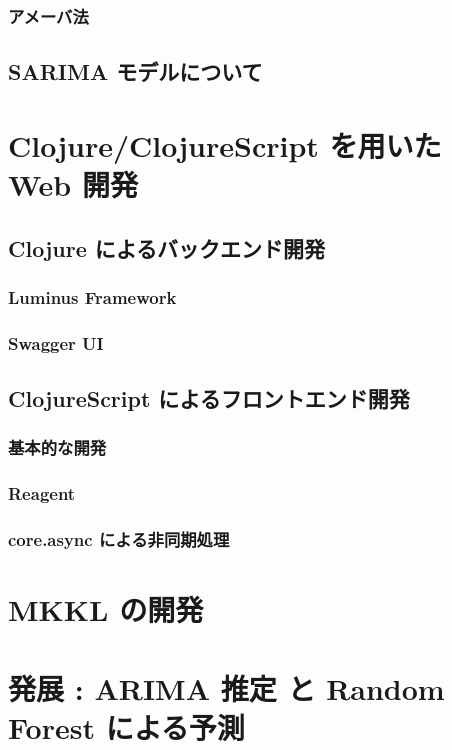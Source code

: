 \documentclass{scrartcl}
\begin{document}
\subsubsection{アメーバ法}
\label{sec:orga5ac902}
\subsection{SARIMA モデルについて}
\label{sec:orgc9c7544}
\section{Clojure/ClojureScript を用いた Web 開発}
\label{sec:org59c131f}
\subsection{Clojure によるバックエンド開発}
\label{sec:org7cb7f31}
\subsubsection{Luminus Framework}
\label{sec:orge9b1b5c}
\subsubsection{Swagger UI}
\label{sec:orga1f3ce3}
\subsection{ClojureScript によるフロントエンド開発}
\label{sec:org8001120}
\subsubsection{基本的な開発}
\label{sec:orgd3c8ab7}
\subsubsection{Reagent}
\label{sec:org9bd5561}
\subsubsection{core.async による非同期処理}
\label{sec:orgcdd867d}
\section{MKKL の開発}
\label{sec:orgc799ebe}
\section{発展 : ARIMA 推定 と Random Forest による予測}
\label{sec:orgc59cb50}
\end{document}
